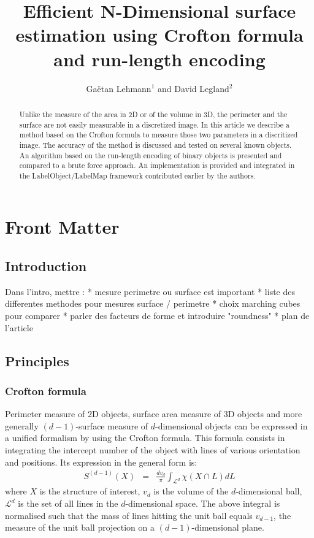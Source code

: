 \documentclass{InsightArticle}
\title{Efficient N-Dimensional surface estimation using Crofton formula and run-length encoding}
\author{Ga\"etan Lehmann{$^1$} {\small{and}} David Legland{$^2$}}
\begin{document}
\maketitle

\ifhtml
\chapter*{Front Matter\label{front}}
\fi


\begin{abstract}
\noindent
Unlike the measure of the area in 2D or of the volume in 3D, the perimeter and the surface are not easily measurable in a discretized image.
In this article we describe a method based on the Crofton formula to measure those two parameters in a discritized image. The accuracy of
the method is discussed and tested on several known objects. An algorithm based on the run-length encoding of binary objects is presented
and compared to a brute force approach.
An implementation is provided and integrated in the LabelObject/LabelMap framework contributed earlier by the authors.
\end{abstract}

\tableofcontents

\section{Introduction}

Dans l'intro, mettre :
* mesure perimetre ou surface est important
* liste des differentes methodes pour mesures surface / perimetre
    * choix marching cubes pour comparer
* parler des facteurs de forme et introduire "roundness"
* plan de l'article

\section{Principles}
\subsection{Crofton formula}

Perimeter measure of 2D objects, surface area measure of 3D objects 
and more generally $(d-1)$-surface measure of $d$-dimensional objects 
can be expressed in a unified formalism by using the Crofton formula.
This formula consists in integrating the intercept number of the object with
lines of various orientation and positions. Its expression in
the general form is:
\begin{eqnarray}
S^{(d-1)}(X) & = & \frac{d v_d}{\pi}\int_{\mathcal{L}^d}\chi\left(X\cap L\right) dL
\end{eqnarray}
where $X$ is the structure of interest, $v_d$ is the volume of the $d$-dimensional ball,
$\mathcal{L}^d$ is the set of all lines in the $d$-dimensional space. 
The above integral is normalised such that the mass of lines hitting the unit ball 
equals $v_{d-1}$, the measure of the unit ball projection on a $(d-1)$-dimensional plane.
\end{document}
